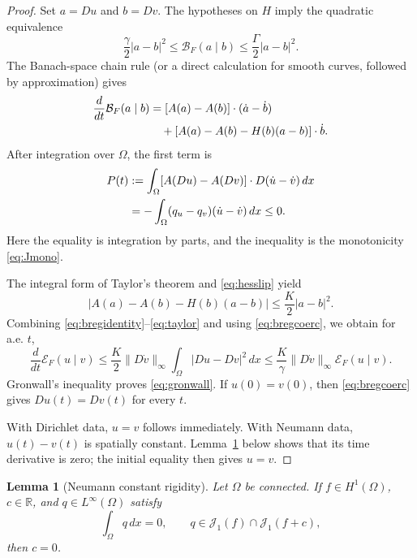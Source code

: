 \documentclass[11pt]{article}
\newtheorem{lemma}[theorem]{Lemma}
\newcommand{\Om}{\Omega}
\newcommand{\R}{\mathbb R}
\newcommand{\Breg}{\mathcal B_F}
\newcommand{\Erel}{\mathcal E_F}
\newcommand{\J}{\mathcal J_1}
\begin{document}
\begin{proof}
Set $a=Du$ and $b=Dv$.  The hypotheses on $H$ imply the quadratic
equivalence
\begin{equation}\label{eq:bregcoerc}
  \frac\gamma2|a-b|^2\le\Breg(a\mid b)
  \le\frac\Gamma2|a-b|^2.
\end{equation}
The Banach-space chain rule (or a direct calculation for smooth curves,
followed by approximation) gives
\begin{align}
 \frac d{dt}\Breg(a\mid b)
 &= [A(a)-A(b)]\cdot(\dot a-\dot b) \notag\\
 &\quad+
 [A(a)-A(b)-H(b)(a-b)]\cdot\dot b. \label{eq:bregidentity}
\end{align}
After integration over $\Om$, the first term is
\begin{align}
 P(t)&:=\int_\Om[A(Du)-A(Dv)]\cdot
                   D(\dot u-\dot v)\,dx \notag\\
     &=-\int_\Om(q_u-q_v)(\dot u-\dot v)\,dx\le0. \label{eq:pairing}
\end{align}
Here the equality is integration by parts, and the inequality is the
monotonicity \eqref{eq:Jmono}.

The integral form of Taylor's theorem and \eqref{eq:hesslip} yield
\begin{equation}\label{eq:taylor}
 \big|A(a)-A(b)-H(b)(a-b)\big|
 \le\frac K2|a-b|^2.
\end{equation}
Combining \eqref{eq:bregidentity}--\eqref{eq:taylor} and using
\eqref{eq:bregcoerc}, we obtain for a.e. $t$,
\[
 \frac d{dt}\Erel(u\mid v)
 \le \frac K2\|D\dot v\|_\infty
       \int_\Om|Du-Dv|^2\,dx
 \le \frac K\gamma\|D\dot v\|_\infty\Erel(u\mid v).
\]
Gronwall's inequality proves \eqref{eq:gronwall}.  If $u(0)=v(0)$,
then \eqref{eq:bregcoerc} gives $Du(t)=Dv(t)$ for every $t$.

With Dirichlet data, $u=v$ follows immediately.  With Neumann data,
$u(t)-v(t)$ is spatially constant.  Lemma~\ref{lem:constant} below shows
that its time derivative is zero; the initial equality then gives $u=v$.
\end{proof}

\begin{lemma}[Neumann constant rigidity]\label{lem:constant}
Let $\Om$ be connected.  If $f\in H^1(\Om)$, $c\in\R$, and
$q\in L^\infty(\Om)$ satisfy
\[
  \int_\Om q\,dx=0,
  \qquad q\in\J(f)\cap\J(f+c),
\]
then $c=0$.
\end{lemma}
\end{document}
